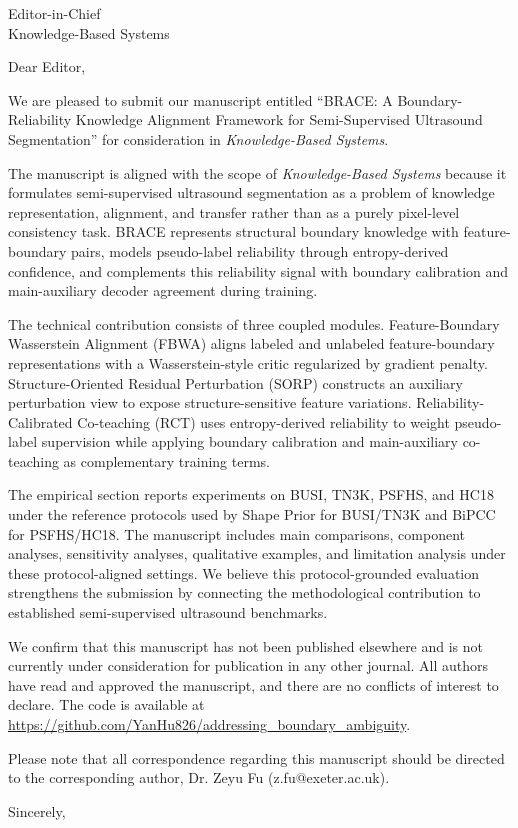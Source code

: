\documentclass{letter}
\begin{document}
\begin{letter}{Editor-in-Chief\\
Knowledge-Based Systems}

\opening{Dear Editor,}

We are pleased to submit our manuscript entitled ``BRACE: A Boundary-Reliability Knowledge Alignment Framework for Semi-Supervised Ultrasound Segmentation'' for consideration in \textit{Knowledge-Based Systems}.

The manuscript is aligned with the scope of \textit{Knowledge-Based Systems} because it formulates semi-supervised ultrasound segmentation as a problem of knowledge representation, alignment, and transfer rather than as a purely pixel-level consistency task. BRACE represents structural boundary knowledge with feature-boundary pairs, models pseudo-label reliability through entropy-derived confidence, and complements this reliability signal with boundary calibration and main-auxiliary decoder agreement during training.

The technical contribution consists of three coupled modules. Feature-Boundary Wasserstein Alignment (FBWA) aligns labeled and unlabeled feature-boundary representations with a Wasserstein-style critic regularized by gradient penalty. Structure-Oriented Residual Perturbation (SORP) constructs an auxiliary perturbation view to expose structure-sensitive feature variations. Reliability-Calibrated Co-teaching (RCT) uses entropy-derived reliability to weight pseudo-label supervision while applying boundary calibration and main-auxiliary co-teaching as complementary training terms.

The empirical section reports experiments on BUSI, TN3K, PSFHS, and HC18 under the reference protocols used by Shape Prior for BUSI/TN3K and BiPCC for PSFHS/HC18. The manuscript includes main comparisons, component analyses, sensitivity analyses, qualitative examples, and limitation analysis under these protocol-aligned settings. We believe this protocol-grounded evaluation strengthens the submission by connecting the methodological contribution to established semi-supervised ultrasound benchmarks.

We confirm that this manuscript has not been published elsewhere and is not currently under consideration for publication in any other journal. All authors have read and approved the manuscript, and there are no conflicts of interest to declare. The code is available at \url{https://github.com/YanHu826/addressing_boundary_ambiguity}.

Please note that all correspondence regarding this manuscript should be directed to the corresponding author, Dr. Zeyu Fu (z.fu@exeter.ac.uk).

\closing{Sincerely,}

\end{letter}
\end{document}
